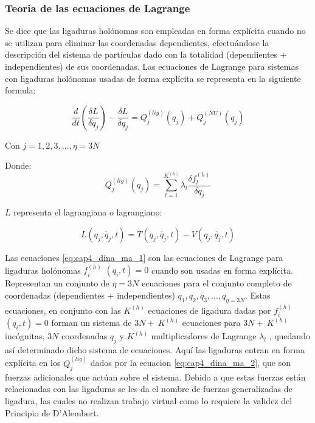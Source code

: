         \subsubsection{Teoria de las ecuaciones de Lagrange}

        Se dice que las ligaduras holónomas son empleadas en forma explícita cuando no se utilizan para eliminar las coordenadas dependientes, efectuándose la descripción del sistema de partículas dado con la totalidad (dependientes + independientes) de sus coordenadas. Las ecuaciones de Lagrange para sistemas con ligaduras holónomas usadas de forma explícita se representa en la siguiente formula:
        
        \begin{equation}
             \frac{d}{dt} \left( \frac{ \delta L}{ \delta \dot{q}_{j}} \right) -\frac{ \delta L}{ \delta q_{j}}=Q_{j}^{ \left( lig \right) } \left( q_{j} \right) +Q_{j}^{ \left( NU \right) } \left( q_{j} \right)
             \label{eq:cap4_dina_ma_1}
        \end{equation}
        
        Con  $ j=1,2,3, \ldots , \eta =3N $ 

        Donde:
        \begin{equation}
          Q_{j}^{ \left( lig \right) } \left( q_{j} \right) = \sum _{l=1}^{K^{ \left( h \right) }} \lambda _{l}\frac{ \delta f_{l}^{ \left( h \right) }}{ \delta q_{j}}
             \label{eq:cap4_dina_ma_2}
        \end{equation}

         \( L \)  representa el lagrangiana o lagrangiano:\par
        
        
        \begin{equation}
         L \left( q_{j},\dot{q_{j}},t \right) =T \left( q_{j},\dot{q_{j}},t \right) -V \left( q_{j},\dot{q_{j}},t \right) 
             \label{eq:cap4_dina_ma_3}
        \end{equation}


      Las ecuaciones \ref{eq:cap4_dina_ma_1} son las ecuaciones de Lagrange para ligaduras holónomas  $f_{i}^{(h)}$ $( q_{i},t) =0$  cuando son usadas en forma explícita. Representan un conjunto de  $\eta =3N$  ecuaciones para el conjunto completo de coordenadas (dependientes + independientes)  $q_{1},q_{2},q_{3},...,q_{\eta=3N}$. Estas ecuaciones, en conjunto con las  $K^{ \left( h \right) }$ ecuaciones de ligadura dadas por $f_{i}^{(h)}$ $( q_{i},t) =0$  forman un sistema de   $ 3N+~K^{ \left( h \right) } $  ecuaciones para  $ 3N+~K^{ \left( h \right) } $  incógnitas,  $ 3N $  coordenadas  $ q_{j} $ y  $ K^{ \left( h \right) } $ multiplicadores de Lagrange  $ \lambda _{l}$ , quedando así determinado dicho sistema de ecuaciones. Aquí las ligaduras entran en forma explícita en los  $ Q_{j}^{ \left( lig \right) }$ dados por la ecuacion \ref{eq:cap4_dina_ma_2}, que son fuerzas adicionales que actúan sobre el sistema. Debido a que estas fuerzas están relacionadas con las ligaduras se les da el nombre de fuerzas generalizadas de ligadura, las cuales no realizan trabajo virtual como lo requiere la validez del Principio de D’Alembert.


